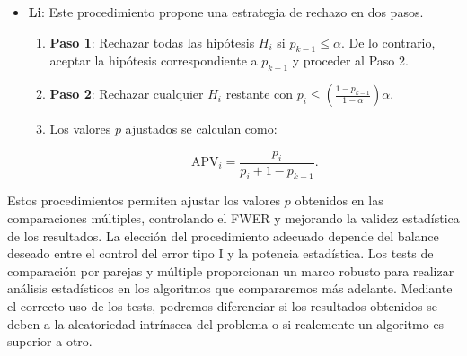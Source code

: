 \begin{itemize}
    \item \textbf{Li}: Este procedimiento propone una estrategia de rechazo en dos pasos.

    \begin{enumerate}
        \item \textbf{Paso 1}: Rechazar todas las hipótesis $H_i$ si $p_{k - 1} \leq \alpha$. De lo contrario, aceptar la hipótesis correspondiente a $p_{k - 1}$ y proceder al Paso 2.

        \item \textbf{Paso 2}: Rechazar cualquier $H_i$ restante con $p_i \leq \left( \frac{1 - p_{k - 1}}{1 - \alpha} \right) \alpha$.

        \item Los valores $p$ ajustados se calculan como:

        \[
        \text{APV}_i = \frac{p_i}{p_i + 1 - p_{k - 1}}.
        \]
    \end{enumerate}
\end{itemize}

Estos procedimientos permiten ajustar los valores $p$ obtenidos en las comparaciones múltiples, controlando el FWER y mejorando la validez estadística de los resultados. La elección del procedimiento adecuado depende del balance deseado entre el control del error tipo I y la potencia estadística.
\vspace{10px}
Los tests de comparación por parejas y múltiple proporcionan un marco robusto para realizar análisis estadísticos en los algoritmos que compararemos más adelante. Mediante el correcto uso de los tests, podremos diferenciar si los resultados obtenidos se deben a la aleatoriedad intrínseca del problema o si realemente un algoritmo es superior a otro.


\endinput
